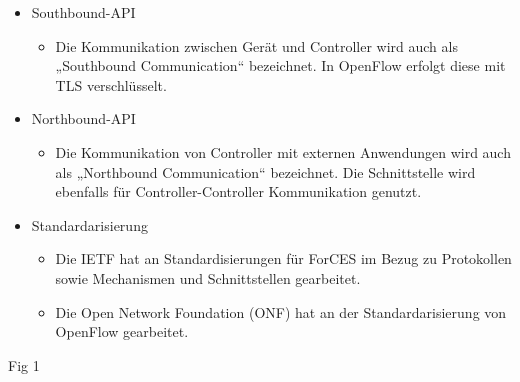 \documentclass[twoside,12pt]{scrartcl}
\begin{document}
\begin{itemize}
\begin{itemize}
		\end{itemize}
		\item Southbound-API
		\begin{itemize}
			\item Die Kommunikation zwischen Gerät und Controller wird auch als „Southbound Communication“ bezeichnet. In OpenFlow erfolgt diese mit TLS verschlüsselt.
		\end{itemize}
		\item Northbound-API
		\begin{itemize}
			\item Die Kommunikation von Controller mit externen Anwendungen  wird auch als „Northbound Communication“ bezeichnet. Die Schnittstelle wird ebenfalls für Controller-Controller Kommunikation genutzt.
		\end{itemize}
		\item Standardarisierung
		\begin{itemize}
			\item Die IETF hat an Standardisierungen für ForCES im Bezug zu Protokollen sowie Mechanismen und Schnittstellen gearbeitet.
			\item Die Open Network Foundation (ONF) hat an der Standardarisierung von OpenFlow gearbeitet.
		\end{itemize}
	\end{itemize}

Fig 1
\end{document}
